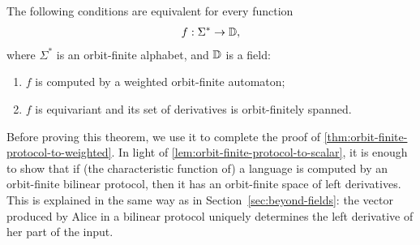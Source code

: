 \begin{theorem}\label{thm:orbit-finite-fliess}
    The following conditions are equivalent for every  function
    \begin{align*}
    f : \Sigma^* \to \mathbb D,
    \end{align*}
    where $\Sigma^*$ is an orbit-finite alphabet, and $\mathbb D$ is a field: 
    \begin{enumerate}
        \item \label{it:fliess-weighted} $f$ is computed by a weighted orbit-finite automaton;
        \item \label{it:fliess-derivatives} $f$ is equivariant and its set of derivatives is orbit-finitely spanned.
    \end{enumerate}
\end{theorem}

Before proving this theorem, we use it to complete the proof of \cref{thm:orbit-finite-protocol-to-weighted}. In light of  \cref{lem:orbit-finite-protocol-to-scalar}, it is enough to show that if (the characteristic function of) a  language is computed by an orbit-finite bilinear protocol, then it has  an orbit-finite space of left derivatives. This is explained in the same way as in Section~\ref{sec:beyond-fields}: the vector produced by Alice in a bilinear protocol uniquely determines the left derivative of her part of the input. 

